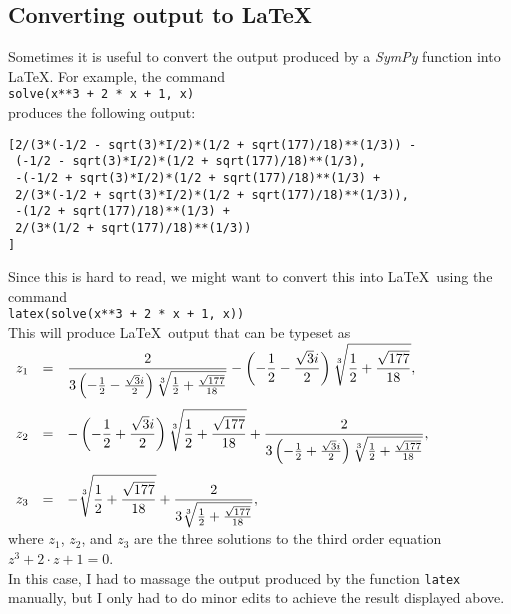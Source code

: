 \documentclass{report}
\newcommand{\ds}{\displaystyle}
\begin{document}
\subsection{Converting output to \LaTeX}
Sometimes it is useful to convert the output produced by a \textsl{SymPy} function into \LaTeX.
For example, the command
\\[0.2cm]
\hspace*{1.3cm}
\texttt{solve(x**3 + 2 * x + 1, x)}
\\[0.2cm]
produces the following output:
\begin{verbatim}
[2/(3*(-1/2 - sqrt(3)*I/2)*(1/2 + sqrt(177)/18)**(1/3)) - 
 (-1/2 - sqrt(3)*I/2)*(1/2 + sqrt(177)/18)**(1/3), 
 -(-1/2 + sqrt(3)*I/2)*(1/2 + sqrt(177)/18)**(1/3) + 
 2/(3*(-1/2 + sqrt(3)*I/2)*(1/2 + sqrt(177)/18)**(1/3)), 
 -(1/2 + sqrt(177)/18)**(1/3) + 
 2/(3*(1/2 + sqrt(177)/18)**(1/3))
]
\end{verbatim}
Since this is hard to read, we might want to convert this into \LaTeX\ using the command
\\[0.2cm]
\hspace*{1.3cm}
\texttt{latex(solve(x**3 + 2 * x + 1, x))}
\\[0.2cm]
This will produce \LaTeX\ output that can be typeset as
\\[0.2cm]
\hspace*{1.3cm}
$\begin{array}[t]{lcl}
 z_1 & = & \ds \frac{2}{3 \left(- \frac{1}{2} - \frac{\sqrt{3} i}{2}\right)
  \sqrt[3]{\frac{1}{2} + \frac{\sqrt{177}}{18}}} - \left(- \frac{1}{2} - \frac{\sqrt{3}i}{2}\right) \sqrt[3]{\frac{1}{2} + \frac{\sqrt{177}}{18}}, \\[0.8cm]
 z_2 & = & \ds - \left(- \frac{1}{2} +  \frac{\sqrt{3} i}{2}\right) \sqrt[3]{\frac{1}{2} + \frac{\sqrt{177}}{18}} + \frac{2}{3
  \left(- \frac{1}{2} + \frac{\sqrt{3} i}{2}\right) \sqrt[3]{\frac{1}{2} +
    \frac{\sqrt{177}}{18}}}, \\[0.8cm]
 z_3 & = & \ds - \sqrt[3]{\frac{1}{2} + \frac{\sqrt{177}}{18}} + \frac{2}{3
  \sqrt[3]{\frac{1}{2} + \frac{\sqrt{177}}{18}}},
\end{array}
$
\\[0.2cm]
where $z_1$, $z_2$, and $z_3$ are the three solutions to the third order equation
\\[0.2cm]
\hspace*{1.3cm}
$z^3 + 2 \cdot z + 1 = 0$.
\\[0.2cm]
In this case, I had to massage the output produced by the function \texttt{latex} manually, but I
only had to do minor edits to achieve the result displayed above.
\end{document}
